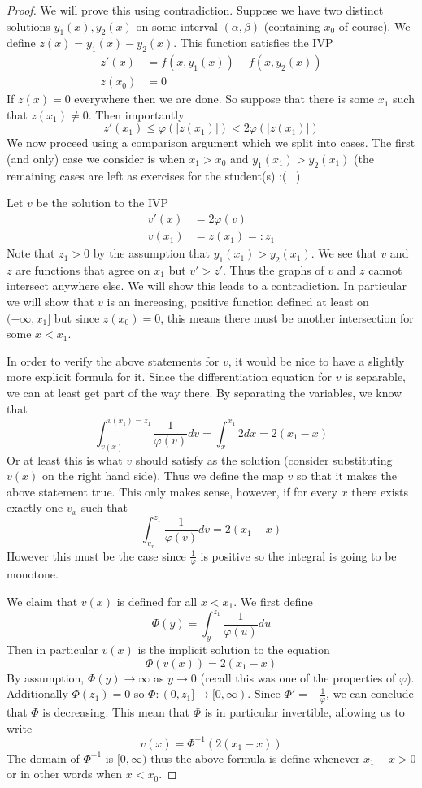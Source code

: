 \begin{proof}
    We will prove this using contradiction. Suppose we have two distinct solutions $y_1(x), y_2(x)$ on some interval $(\alpha, \beta)$ (containing $x_0$ of course). We define $z(x) = y_1(x) - y_2(x)$. This function satisfies the IVP
    \begin{align*}
        z'(x) &= f(x, y_1(x)) - f(x, y_2(x))\\
        z(x_0) &= 0
    \end{align*}
    If $z(x) = 0$ everywhere then we are done. So suppose that there is some $x_1$ such that $z(x_1) \neq 0$. Then importantly
    $$ z'(x_1) \leq \varphi(|z(x_1)|) < 2 \varphi(|z(x_1)|) $$
    We now proceed using a comparison argument which we split into cases. The first (and only) case we consider is when $x_1 > x_0$ and $y_1(x_1) > y_2(x_1)$ (the remaining cases are left as exercises for the student(s) :( \ ).
    
    Let $v$ be the solution to the IVP
    \begin{align*}
        v'(x) &= 2 \varphi(v)\\
        v(x_1) &= z(x_1) =: z_1
    \end{align*}
    Note that $z_1 > 0$ by the assumption that $y_1(x_1) > y_2(x_1)$.
    We see that $v$ and $z$ are functions that agree on $x_1$ but $v' > z'$. Thus the graphs of $v$ and $z$ cannot intersect anywhere else. We will show this leads to a contradiction. In particular we will show that $v$ is an increasing, positive function defined at least on $(-\infty, x_1]$ but since $z(x_0) = 0$, this means there must be another intersection for some $x < x_1$.
    
    In order to verify the above statements for $v$, it would be nice to have a slightly more explicit formula for it. Since the differentiation equation for $v$ is separable, we can at least get part of the way there.
    By separating the variables, we know that
    $$ \int_{v(x)}^{v(x_1) = z_1} \frac{1}{\varphi(v)} dv = \int_{x}^{x_1} 2 dx = 2(x_1 - x) $$
    Or at least this is what $v$ should satisfy as the solution (consider substituting $v(x)$ on the right hand side). Thus we define the map $v$ so that it makes the above statement true. This only makes sense, however, if for every $x$ there exists exactly one $v_x$ such that
    $$ \int_{v_x}^{z_1} \frac{1}{\varphi(v)} dv = 2(x_1 - x) $$
    However this must be the case since $\frac{1}{\varphi}$ is positive so the integral is going to be monotone.
    
    We claim that $v(x)$ is defined for all $x < x_1$. We first define
    $$ \Phi(y) = \int_{y}^{z_1} \frac{1}{\varphi(u)} du $$
    Then in particular $v(x)$ is the implicit solution to the equation
    $$ \Phi(v(x)) = 2(x_1 - x) $$
    By assumption, $\Phi(y) \to \infty$ as $y \to 0$ (recall this was one of the properties of $\varphi$). Additionally $\Phi(z_1) = 0$ so $\Phi: (0, z_1] \to [0, \infty)$. Since
    $\Phi' = -\frac{1}{\varphi}$, we can conclude that $\Phi$ is decreasing. This mean that $\Phi$ is in particular invertible, allowing us to write
    $$ v(x) = \Phi^{-1}(2(x_1 - x)) $$
    The domain of $\Phi^{-1}$ is $[0, \infty)$ thus the above formula is define whenever $x_1 - x > 0$ or in other words when $x < x_0$. 
    

\end{proof}
